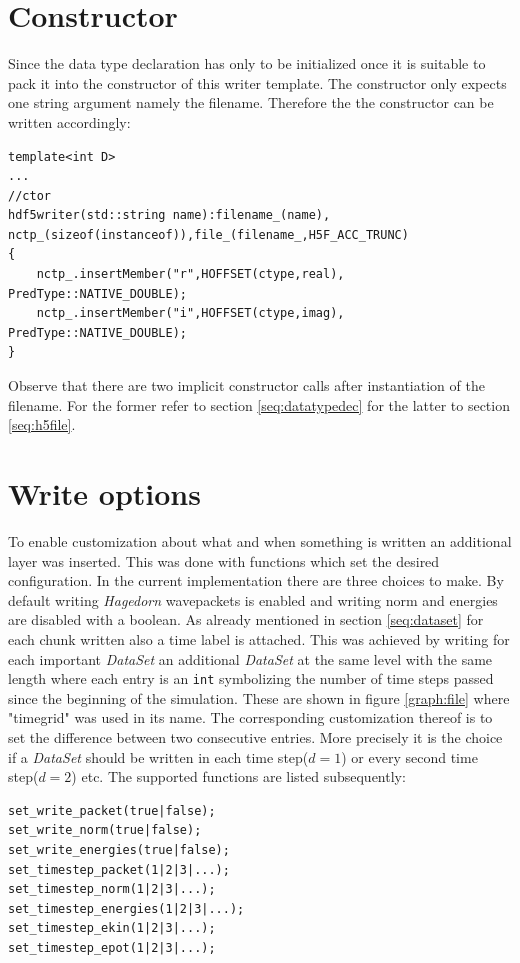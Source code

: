 \section{Constructor}
Since the data type declaration has only to be initialized once it is suitable to pack it into the constructor of this writer template. The constructor only expects one string argument namely the filename. Therefore the the constructor can be written accordingly:
\begin{lstlisting}
template<int D>
...
//ctor
hdf5writer(std::string name):filename_(name), nctp_(sizeof(instanceof)),file_(filename_,H5F_ACC_TRUNC)
{
	nctp_.insertMember("r",HOFFSET(ctype,real), PredType::NATIVE_DOUBLE);
	nctp_.insertMember("i",HOFFSET(ctype,imag), PredType::NATIVE_DOUBLE);
}
\end{lstlisting}
Observe that there are two implicit constructor calls after instantiation of the filename. For the former refer to section \ref{seq:datatypedec} for the latter to section \ref{seq:h5file}.

\section{Write options}
To enable customization about what and when something is written an additional layer was inserted. This was done with functions which set the desired configuration. In the current implementation there are three choices to make. By default writing \textit{Hagedorn} wavepackets is enabled and writing norm and energies are disabled with a boolean. As already mentioned in section \ref{seq:dataset} for each chunk written also a time label is attached. This was achieved by writing for each important \textit{DataSet} an additional \textit{DataSet} at the same level with the same length where each entry is an \texttt{int} symbolizing the number of time steps passed since the beginning of the simulation. These are shown in figure \ref{graph:file} where "timegrid" was used in its name. The corresponding customization thereof is to set the difference between two consecutive entries. More precisely it is the choice if a \textit{DataSet} should be written in each time step($d=1$) or every second time step($d=2$) etc. The supported functions are listed subsequently:
\begin{lstlisting}
set_write_packet(true|false);
set_write_norm(true|false);
set_write_energies(true|false);
set_timestep_packet(1|2|3|...);
set_timestep_norm(1|2|3|...);
set_timestep_energies(1|2|3|...);
set_timestep_ekin(1|2|3|...);
set_timestep_epot(1|2|3|...);
\end{lstlisting}


